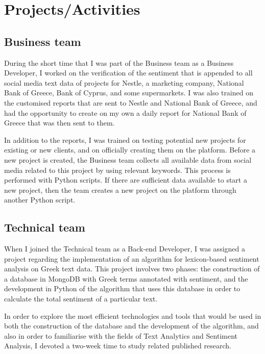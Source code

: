 \section{Projects/Activities}
\label{sec:projects}

\subsection{Business team}
\label{subsec:business-activities}

During the short time that I was part
of the Business team as a Business Developer,
I worked on the verification of the sentiment
that is appended to all social media text data
of projects for Nestle, a marketing company, National Bank of Greece,
Bank of Cyprus, and some supermarkets.
I was also trained on the customised reports
that are sent to Nestle and National Bank of Greece,
and had the opportunity
to create on my own a daily report for National Bank of Greece
that was then sent to them.

In addition to the reports,
I was trained on testing potential new projects
for existing or new clients,
and on officially creating them on the platform.
Before a new project is created,
the Business team collects all available data from social media
related to this project
by using relevant keywords.
This process is performed with Python scripts.
If there are sufficient data available
to start a new project,
then the team creates a new project on the platform
through another Python script.

\subsection{Technical team}
\label{subsec:technical-activities}

When I joined the Technical team as a Back-end Developer,
I was assigned a project regarding the implementation of an algorithm
for lexicon-based sentiment analysis on Greek text data.
This project involves two phases:
the construction of a database in MongoDB
with Greek terms annotated with sentiment,
and the development in Python of the algorithm
that uses this database
in order to calculate the total sentiment of a particular text.

In order to explore the most efficient technologies and tools
that would be used in both the construction of the database
and the development of the algorithm,
and also in order to familiarise with the fields
of Text Analytics and Sentiment Analysis,
I devoted a two-week time to study related published research.

